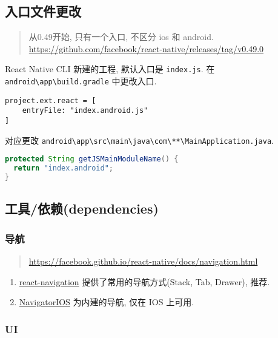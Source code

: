 \subsection{入口文件更改}\label{ux5165ux53e3ux6587ux4ef6ux66f4ux6539}

\begin{quote}
从0.49开始, 只有一个入口, 不区分 ios 和 android.
\url{https://github.com/facebook/react-native/releases/tag/v0.49.0}
\end{quote}

React Native CLI 新建的工程, 默认入口是 \lstinline!index.js!. 在
\lstinline!android\app\build.gradle! 中更改入口.

\begin{lstlisting}
project.ext.react = [
    entryFile: "index.android.js"
]
\end{lstlisting}

对应更改
\lstinline!android\app\src\main\java\com\**\MainApplication.java!.

\begin{lstlisting}[language=Java]
protected String getJSMainModuleName() {
  return "index.android";
}
\end{lstlisting}

\subsection{工具/依赖(dependencies)}\label{ux5de5ux5177ux4f9dux8d56dependencies}

\subsubsection{导航}\label{ux5bfcux822a}

\begin{quote}
\url{https://facebook.github.io/react-native/docs/navigation.html}
\end{quote}

\begin{enumerate}
\def\labelenumi{\arabic{enumi}.}
\tightlist
\item
  \href{https://github.com/react-navigation/react-navigation}{react-navigation}
  提供了常用的导航方式(Stack, Tab, Drawer), 推荐.
\item
  \href{https://facebook.github.io/react-native/docs/navigatorios.html}{NavigatorIOS}
  为内建的导航, 仅在 IOS 上可用.
\end{enumerate}

\subsubsection{UI}\label{ui-1}

